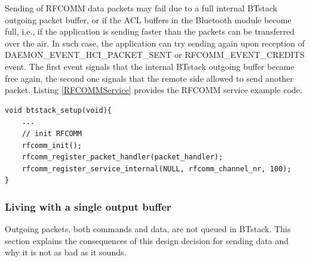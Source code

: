 Sending of RFCOMM data packets may fail due to a full internal BTstack outgoing packet buffer, or if the ACL buffers in the Bluetooth module become full, i.e., if the application is sending faster than the packets can be transferred over the air. In such case, the application can try sending again upon reception of DAEMON\_EVENT\_HCI\_PACKET\_SENT or RFCOMM\_EVENT\_CREDITS event. The first event signals that the internal BTstack outgoing buffer became free again, the second one signals that the remote side allowed to send another  packet. Listing \ref{RFCOMMService} provides the RFCOMM service example code.

\begin{lstlisting}[caption= RFCOMM service with automatic credit management. , label=automaticFlowControl]
void btstack_setup(void){
    ...
    // init RFCOMM
    rfcomm_init();
    rfcomm_register_packet_handler(packet_handler);
    rfcomm_register_service_internal(NULL, rfcomm_channel_nr, 100); 
}
\end{lstlisting}


\subsubsection{Living with a single output buffer}
\label{section:single_buffer}
Outgoing packets, both commands and data, are not queued in BTstack. This section explains the consequences of this design decision for sending data and why it is not as bad as it sounds.

